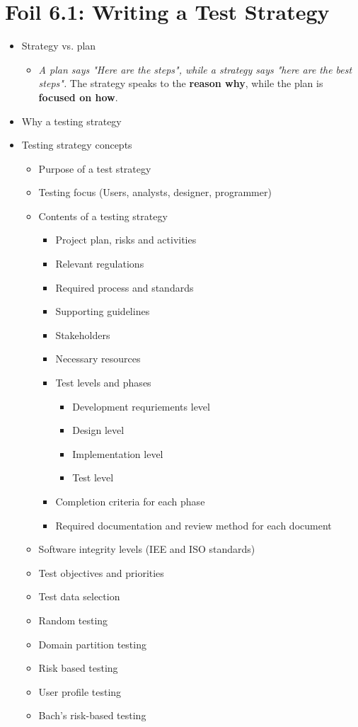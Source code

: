 	\section{Foil 6.1: Writing a Test Strategy}
		\begin{itemize}
			\item Strategy vs. plan
				\begin{itemize}	
					\item {\it A plan says "Here are the steps", while a strategy says
					"here are the best steps".} The strategy speaks to the {\bf reason why},
					while the plan is {\bf focused on how}.
				\end{itemize}	
			\item Why a testing strategy
			\item Testing strategy concepts
				\begin{itemize}
					\item Purpose of a test strategy
					\item Testing focus (Users, analysts, designer, programmer)
					\item Contents of a testing strategy
						\begin{itemize}
							\item Project plan, risks and activities
							\item Relevant regulations
							\item Required process and standards
							\item Supporting guidelines
							\item Stakeholders
							\item Necessary resources
							\item Test levels and phases
								\begin{itemize}
									\item Development requriements level
									\item Design level
									\item Implementation level
									\item Test level
								\end{itemize}
							\item Completion criteria for each phase
							\item Required documentation and review method for each document
						\end{itemize}
					\item Software integrity levels (IEE and ISO standards)
					\item Test objectives and priorities
					\item Test data selection
					\item Random testing
					\item Domain partition testing
					\item Risk based testing
					\item User profile testing
					\item Bach's risk-based testing
				\end{itemize}
		\end{itemize}

